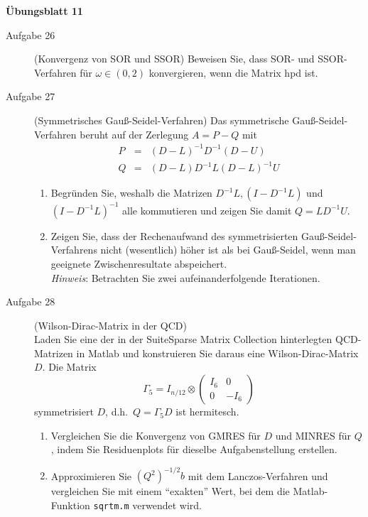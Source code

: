 \documentclass[a4paper,11pt]{scrartcl}
\begin{document}
\aihead

\begin{center}
  {\large\textbf{Übungsblatt 11}}
\end{center}


\begin{description}
\item[Aufgabe 26] (Konvergenz von SOR und SSOR)
Beweisen Sie, dass SOR- und SSOR-Verfahren f\"ur $\omega \in (0,2)$ konvergieren, wenn die Matrix hpd ist.
 \medskip
 
\item[Aufgabe 27] (Symmetrisches Gauß-Seidel-Verfahren)
Das symmetrische Gauß-Seidel-Verfahren beruht auf der Zerlegung $A = P-Q$ mit
\begin{eqnarray*}
P &=& (D-L)^{-1}D^{-1}(D-U) \\
Q &=& (D-L)D^{-1}L(D-L)^{-1}U
\end{eqnarray*}

\begin{enumerate}
\item Begr\"unden Sie, weshalb die Matrizen $D^{-1}L, (I-D^{-1}L)$ und $(I-D^{-1}L)^{-1}$ alle kommutieren und zeigen Sie damit $Q = LD^{-1}U$.
\item Zeigen Sie, dass der Rechenaufwand des symmetrisierten Gau\ss{}-Seidel-Verfahrens nicht (wesentlich) h\"oher ist als bei Gau\ss{}-Seidel, wenn man geeignete Zwischenresultate abspeichert. \\
{\em Hinweis}: Betrachten Sie zwei aufeinanderfolgende Iterationen.
\end{enumerate}
\medskip
 
\item[Aufgabe 28] (Wilson-Dirac-Matrix in der QCD) \\
Laden Sie eine der in der SuiteSparse Matrix Collection hinterlegten QCD-Matrizen in Matlab und konstruieren Sie daraus eine Wilson-Dirac-Matrix $D$.
Die Matrix
\[
\Gamma_5 = I_{n/12} \otimes \begin{pmatrix} I_6 & 0 \\ 0 & -I_6 \end{pmatrix}
\]
symmetrisiert $D$, d.h.\ $Q = \Gamma_5 D$ ist hermitesch.
\begin{enumerate}
\item Vergleichen Sie die Konvergenz von GMRES für $D$ und MINRES für $Q$, indem Sie Residuenplots für dieselbe Aufgabenstellung erstellen.
\item Approximieren Sie $(Q^2)^{-1/2}b$ mit dem Lanczos-Verfahren und vergleichen Sie mit einem ``exakten'' Wert, bei dem die Matlab-Funktion \texttt{sqrtm.m} verwendet wird.
\end{enumerate}
\end{description}
\end{document}

